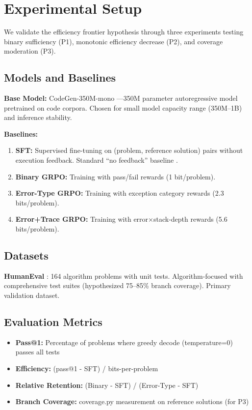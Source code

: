 \section{Experimental Setup}

We validate the efficiency frontier hypothesis through three experiments testing binary sufficiency (P1), monotonic efficiency decrease (P2), and coverage moderation (P3).

\subsection{Models and Baselines}

\textbf{Base Model:} CodeGen-350M-mono \cite{nijkamp2023codegen}---350M parameter autoregressive model pretrained on code corpora. Chosen for small model capacity range (350M--1B) and inference stability.

\textbf{Baselines:}
\begin{enumerate}
\item \textbf{SFT:} Supervised fine-tuning on (problem, reference solution) pairs without execution feedback. Standard ``no feedback'' baseline \cite{le2022coderl,cho2025cocos}.
\item \textbf{Binary GRPO:} Training with pass/fail rewards (1 bit/problem).
\item \textbf{Error-Type GRPO:} Training with exception category rewards (2.3 bits/problem).
\item \textbf{Error+Trace GRPO:} Training with error$\times$stack-depth rewards (5.6 bits/problem).
\end{enumerate}

\subsection{Datasets}

\textbf{HumanEval} \cite{austin2021program}: 164 algorithm problems with unit tests. Algorithm-focused with comprehensive test suites (hypothesized 75--85\% branch coverage). Primary validation dataset.

\subsection{Evaluation Metrics}

\begin{itemize}
\item \textbf{Pass@1:} Percentage of problems where greedy decode (temperature=0) passes all tests
\item \textbf{Efficiency:} (pass@1 - SFT) / bits-per-problem
\item \textbf{Relative Retention:} (Binary - SFT) / (Error-Type - SFT)
\item \textbf{Branch Coverage:} coverage.py measurement on reference solutions (for P3)
\end{itemize}

